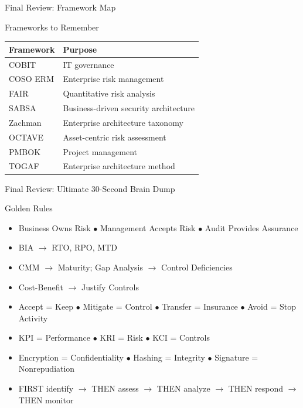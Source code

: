 \documentclass{beamer}
\begin{document}
	\begin{frame}{Final Review: Framework Map}
		\begin{block}{Frameworks to Remember}
			\begin{tabular}{|p{3cm}|p{8cm}|}
				\hline
				\textbf{Framework} & \textbf{Purpose} \\
				\hline
				COBIT & IT governance \\
				\hline
				COSO ERM & Enterprise risk management \\
				\hline
				FAIR & Quantitative risk analysis \\
				\hline
				SABSA & Business-driven security architecture \\
				\hline
				Zachman & Enterprise architecture taxonomy \\
				\hline
				OCTAVE & Asset-centric risk assessment \\
				\hline
				PMBOK & Project management \\
				\hline
				TOGAF & Enterprise architecture method \\
				\hline
			\end{tabular}
		\end{block}
	\end{frame}
	
	\begin{frame}{Final Review: Ultimate 30-Second Brain Dump}
		\begin{block}{Golden Rules}
			\begin{itemize}
				\item Business Owns Risk $\bullet$ Management Accepts Risk $\bullet$ Audit Provides Assurance
				\item BIA $\rightarrow$ RTO, RPO, MTD
				\item CMM $\rightarrow$ Maturity; Gap Analysis $\rightarrow$ Control Deficiencies
				\item Cost-Benefit $\rightarrow$ Justify Controls
				\item Accept = Keep $\bullet$ Mitigate = Control $\bullet$ Transfer = Insurance $\bullet$ Avoid = Stop Activity
				\item KPI = Performance $\bullet$ KRI = Risk $\bullet$ KCI = Controls
				\item Encryption = Confidentiality $\bullet$ Hashing = Integrity $\bullet$ Signature = Nonrepudiation
				\item FIRST identify $\rightarrow$ THEN assess $\rightarrow$ THEN analyze $\rightarrow$ THEN respond $\rightarrow$ THEN monitor
			\end{itemize}
		\end{block}
	\end{frame}
	
\end{document}
